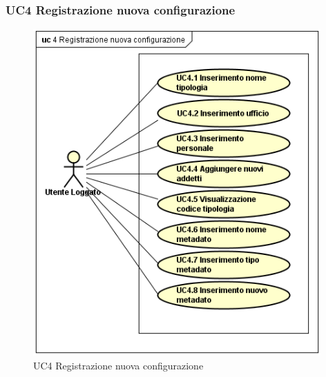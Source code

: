 \subsubsection{UC4 Registrazione nuova configurazione}
    \label{UC4}
    \begin{figure}[!h] 
        \centering 
        \includegraphics[width = 11cm]{immagini/UseCase/regnuovaconfig.png}
        \caption{UC4 Registrazione nuova configurazione}
    \end{figure}
    
